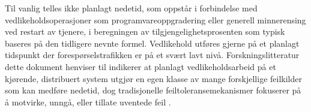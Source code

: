 Til vanlig telles ikke planlagt nedetid, som oppstår i forbindelse med vedlikeholdsoperasjoner som programvareoppgradering eller generell minnerensing ved restart av tjenere, i beregningen av tilgjengelighetsprosenten som typisk baseres på den tidligere nevnte formel. Vedlikehold utføres gjerne på et planlagt tidspunkt der forespørselstrafikken er på et svært lavt nivå. Forskningslitteratur dette dokument henviser til indikerer at planlagt vedlikeholdsarbeid på et kjørende, distribuert system utgjør en egen klasse av mange forskjellige feilkilder som kan medføre nedetid, dog tradisjonelle feiltoleransemekanismer fokuserer på å motvirke, unngå, eller tillate uventede feil \citep{dumitracs2009upgrades}.


